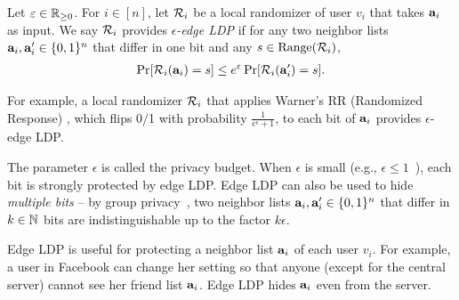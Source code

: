 \begin{definition}  \label{chap2-def:edge_LDP} 
Let $\varepsilon \in \mathbb{R}_{\ge0}$. 
  For 
  $i \in [n]$, 
  let $\mathcal{R}_i$ be a 
  local randomizer 
  of user $v_i$ that 
  takes $\mathbf{a}_i$ as input. We say $\mathcal{R}_i$ provides
  \emph{$\epsilon$-edge LDP} 
  if for any two neighbor lists 
  $\mathbf{a}_i, \mathbf{a}'_i \in \{0,1\}^n$ 
  that differ in one bit and any 
  $s \in \mathrm{Range}(\mathcal{R}_i)$, 
\begin{align}
\Pr[\mathcal{R}_i(\mathbf{a}_i) = s] \leq e^\varepsilon \Pr[\mathcal{R}_i(\mathbf{a}'_i) = s].
\label{chap2-eq:edge_LDP}
\end{align}
\end{definition}
For example, a local randomizer $\mathcal{R}_i$ that applies Warner's RR (Randomized Response) \cite{Warner_JASA65}, which flips 0/1 with probability $\frac{1}{e^\epsilon + 1}$, to each bit of $\mathbf{a}_i$ 
provides $\epsilon$-edge LDP. 

The parameter $\epsilon$ is called the privacy budget. 
When 
$\epsilon$ is small (e.g., $\epsilon \leq 1$~\cite{DP_Li}), each bit is strongly protected by edge LDP. 
Edge LDP can also be used to hide \textit{multiple bits} -- 
by group privacy~\cite{DP}, two neighbor lists $\mathbf{a}_i, \mathbf{a}'_i \in \{0,1\}^n$ that differ in $k \in \mathbb{N}$ bits are indistinguishable up to the factor $k\epsilon$. 

Edge LDP is useful for protecting a neighbor list $\mathbf{a}_i$ of each user $v_i$. 
For example, 
a user in Facebook can change her setting so that anyone (except for the central server) cannot see her friend list $\mathbf{a}_i$. 
Edge LDP hides $\mathbf{a}_i$ even from the server. 

